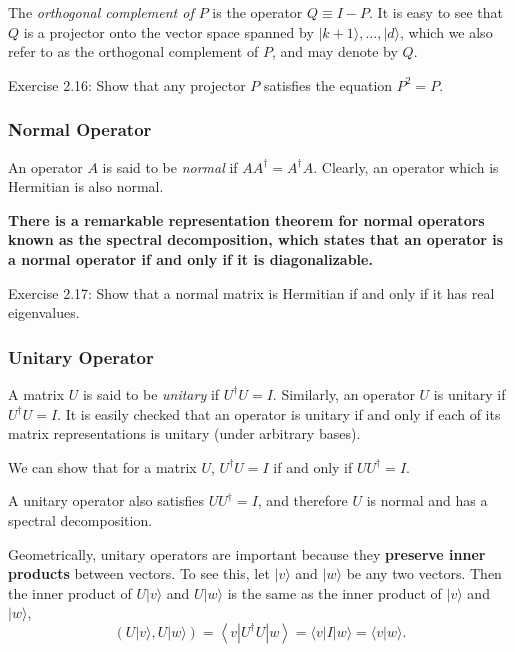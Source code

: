 The \textit{orthogonal complement of $P$} is the operator $Q \equiv I-P$. It is easy to see that $Q$ is a projector onto the vector space spanned by $|k+1\rangle, \ldots,|d\rangle$, which we also refer to as the orthogonal complement of $P$, and may denote by $Q$.

\begin{exercise}
    Exercise 2.16: Show that any projector $P$ satisfies the equation $P^{2}=P$.
\end{exercise}

\subsubsection{Normal Operator}

An operator $A$ is said to be \textit{normal} if $A A^{\dagger}=A^{\dagger} A$. Clearly, an operator which is Hermitian is also normal. 

\textbf{There is a remarkable representation theorem for normal operators known as the spectral decomposition, which states that an operator is a normal operator if and only if it is diagonalizable.}

\begin{exercise}
Exercise 2.17: Show that a normal matrix is Hermitian if and only if it has real eigenvalues.
\end{exercise}

\subsubsection{Unitary Operator}

A matrix $U$ is said to be \textit{unitary} if $U^{\dagger} U=I$. Similarly, an operator $U$ is unitary if $U^{\dagger} U=I$. It is easily checked that an operator is unitary if and only if each of its matrix representations is unitary (under arbitrary bases). 

\begin{remark}
    We can show that for a matrix $U$,  $U^{\dagger} U=I$ if and only if $U U^{\dagger} =I$. 
\end{remark}

A unitary operator also satisfies $U U^{\dagger}=I$, and therefore $U$ is normal and has a spectral decomposition. 

Geometrically, unitary operators are important because they \textbf{preserve inner products} between vectors. To see this, let $|v\rangle$ and $|w\rangle$ be any two vectors. Then the inner product of $U|v\rangle$ and $U|w\rangle$ is the same as the inner product of $|v\rangle$ and $|w\rangle$,
\begin{equation}
    (U|v\rangle, U|w\rangle)=\left\langle v\left|U^{\dagger} U\right| w\right\rangle=\langle v|I| w\rangle=\langle v | w\rangle.
\end{equation}

